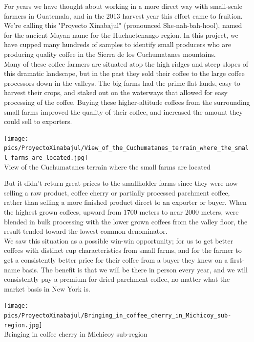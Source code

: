 \documentclass[10pt,twoside,footinclude=true,headinclude=true]{scrbook} %
\begin{document}
For years we have thought about working in a more direct way with small-scale farmers in Guatemala, and in the 2013 harvest year this effort came to fruition.\\
\medskip
We're calling this "Proyecto Xinabajul" (pronounced She-nah-bah-hool), named for the ancient Mayan name for the Huehuetenango region. In this project, we have cupped many hundreds of samples to identify small producers who are producing quality coffee in the Sierra de los Cuchumatanes mountains.\\
\smallskip
Many of these coffee farmers are situated atop the high ridges and steep slopes of this dramatic landscape, but in the past they sold their coffee to the large coffee processors down in the valleys. The big farms had the prime flat lands, easy to harvest their crops, and staked out on the waterways that allowed for easy processing of the coffee. Buying these higher-altitude coffees from the surrounding small farms improved the quality of their coffee, and increased the amount they could sell to exporters.\\
\begin{center}
	\texttt{[image: pics/ProyectoXinabajul/View\_of\_the\_Cuchumatanes\_terrain\_where\_the\_small\_farms\_are\_located.jpg]} \\
	\scriptsize
	View of the Cuchumatanes terrain where the small farms are located
\end{center}
But it didn't return great prices to the smallholder farms since they were now selling a raw product, coffee cherry or partially processed parchment coffee, rather than selling a more finished product direct to an exporter or buyer. When the highest grown coffees, upward from 1700 meters to near 2000 meters, were blended in bulk processing with the lower grown coffees
from the valley floor, the result tended toward the lowest common denominator.\\
\medskip
We saw this situation as a possible win-win opportunity; for us to get better coffees with distinct cup characteristics from small farms, and for
the farmer to get a consistently better price for their coffee from a buyer they knew on a first-name basis. The benefit is that we will be there in person every year, and we will consistently pay a premium for dried parchment coffee, no matter what the market basis in New York is.\\
\begin{center}
	\texttt{[image: pics/ProyectoXinabajul/Bringing\_in\_coffee\_cherry\_in\_Michicoy\_sub-region.jpg]} \\
	\scriptsize
	Bringing in coffee cherry in Michicoy sub-region
\end{center}
\end{document}

